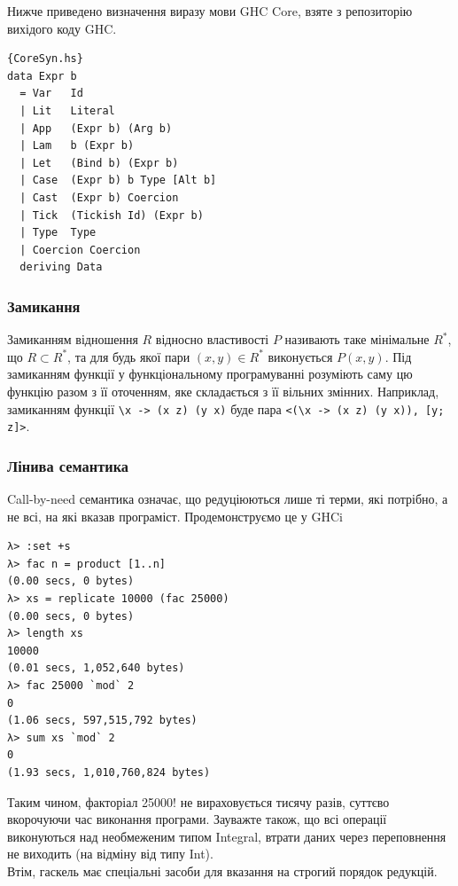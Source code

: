 \documentclass[12pt]{article}
\begin{document}
Нижче приведено визначення виразу мови GHC Core, взяте з репозиторію вихідого коду GHC\cite{coreSource}.\\

\begin{lstlisting}{CoreSyn.hs}
data Expr b
  = Var   Id
  | Lit   Literal
  | App   (Expr b) (Arg b)
  | Lam   b (Expr b)
  | Let   (Bind b) (Expr b)
  | Case  (Expr b) b Type [Alt b]
  | Cast  (Expr b) Coercion
  | Tick  (Tickish Id) (Expr b)
  | Type  Type
  | Coercion Coercion
  deriving Data
\end{lstlisting}


\subsubsection*{Замикання}
Замиканням відношення $R$ відносно властивості $P$ називають таке мінімальне $R^{*}$, що $R \subset R^{*}$, 
та для будь якої пари $(x,y) \in R^{*}$ виконується $P(x,y)$. Під замиканням функції у функціональному 
програмуванні розуміють саму цю функцію разом з її оточенням, яке складається з її вільних змінних. 
Наприклад, замиканням функції \lstinline{\x -> (x z) (y x)} буде пара \lstinline{<(\x -> (x z) (y x)), [y; z]>}.\\

\subsubsection*{Лінива семантика}
Call-by-need семантика означає, що редуціюються лише ті терми, які потрібно, а не всі, на які вказав 
програміст. Продемонструємо це у GHCi\\

\begin{lstlisting}[caption={Ліниві обчислення}]
λ> :set +s
λ> fac n = product [1..n]
(0.00 secs, 0 bytes)
λ> xs = replicate 10000 (fac 25000)
(0.00 secs, 0 bytes)
λ> length xs
10000
(0.01 secs, 1,052,640 bytes)
λ> fac 25000 `mod` 2
0
(1.06 secs, 597,515,792 bytes)
λ> sum xs `mod` 2
0
(1.93 secs, 1,010,760,824 bytes)
\end{lstlisting}

Таким чином, факторіал 25000! не вираховується тисячу разів, суттєво вкорочуючи час виконання програми. 
Зауважте також, що всі операції виконуються над необмеженим типом Integral, втрати даних через 
переповнення не виходить (на відміну від типу Int).\\

Втім, гаскель має спеціальні засоби для вказання на строгий порядок редукцій.\\
\end{document}
